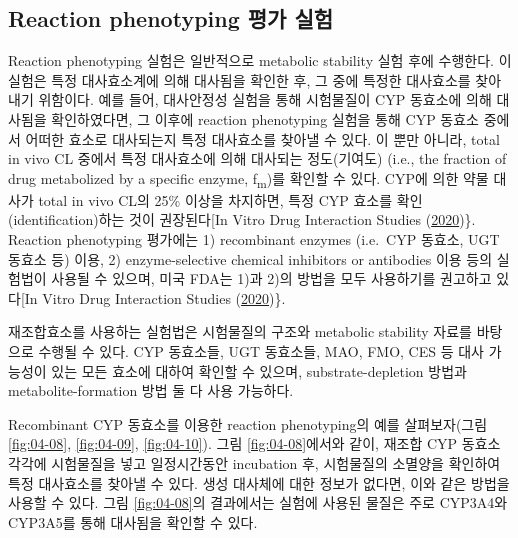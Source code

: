 \documentclass[
  11pt,
  krantz2, a4paper, twoside]{krantz}
\begin{document}
\hypertarget{reaction-phenotyping-uxd3c9uxac00-uxc2e4uxd5d8}{%
\subsection{Reaction phenotyping 평가 실험}\label{reaction-phenotyping-uxd3c9uxac00-uxc2e4uxd5d8}}

Reaction phenotyping 실험은 일반적으로 metabolic stability 실험 후에
수행한다. 이 실험은 특정 대사효소계에 의해 대사됨을 확인한 후, 그 중에
특정한 대사효소를 찾아내기 위함이다. 예를 들어, 대사안정성 실험을 통해
시험물질이 CYP 동효소에 의해 대사됨을 확인하였다면, 그 이후에 reaction
phenotyping 실험을 통해 CYP 동효소 중에서 어떠한 효소로 대사되는지 특정
대사효소를 찾아낼 수 있다. 이 뿐만 아니라, total in vivo CL 중에서 특정
대사효소에 의해 대사되는 정도(기여도) (i.e., the fraction of drug
metabolized by a specific enzyme, f\textsubscript{m})를 확인할 수 있다. CYP에 의한
약물 대사가 total in vivo CL의 25\% 이상을 차지하면, 특정 CYP 효소를
확인(identification)하는 것이 권장된다{[}In Vitro Drug Interaction Studies (\protect\hyperlink{ref-studies2020cytochrome}{2020})\}. Reaction phenotyping
평가에는 1) recombinant enzymes (i.e.~CYP 동효소, UGT 동효소 등) 이용,
2) enzyme-selective chemical inhibitors or antibodies 이용 등의 실험법이
사용될 수 있으며, 미국 FDA는 1)과 2)의 방법을 모두 사용하기를 권고하고
있다{[}In Vitro Drug Interaction Studies (\protect\hyperlink{ref-studies2020cytochrome}{2020})\}.

재조합효소를 사용하는 실험법은 시험물질의 구조와 metabolic stability
자료를 바탕으로 수행될 수 있다. CYP 동효소들, UGT 동효소들, MAO, FMO,
CES 등 대사 가능성이 있는 모든 효소에 대하여 확인할 수 있으며,
substrate-depletion 방법과 metabolite-formation 방법 둘 다 사용
가능하다.

Recombinant CYP 동효소를 이용한 reaction phenotyping의 예를
살펴보자(그림 \ref{fig:04-08}, \ref{fig:04-09}, \ref{fig:04-10}). 그림 \ref{fig:04-08}에서와 같이, 재조합 CYP 동효소 각각에
시험물질을 넣고 일정시간동안 incubation 후, 시험물질의 소멸양을 확인하여
특정 대사효소를 찾아낼 수 있다. 생성 대사체에 대한 정보가 없다면, 이와
같은 방법을 사용할 수 있다. 그림 \ref{fig:04-08}의 결과에서는 실험에 사용된 물질은
주로 CYP3A4와 CYP3A5를 통해 대사됨을 확인할 수 있다.
\end{document}
